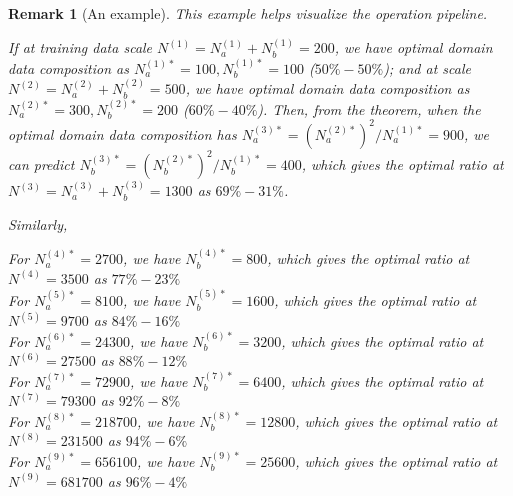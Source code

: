 \documentclass{article} %
\newtheorem{remark}{Remark}
\begin{document}
\begin{appendices}{}
\begin{remark} [An example]
    This example helps visualize the operation pipeline. 
    
    If at training data scale $N^{(1)}=N_a^{(1)}+N_b^{(1)}=200$, we have optimal domain data composition as $N_a^{(1)*}=100, N_b^{(1)*}=100$ ($50\%-50\%$); and at scale $N^{(2)}=N_a^{(2)}+N_b^{(2)}=500$, we have optimal domain data composition as $N_a^{(2)*}=300, N_b^{(2)*}=200$ ($60\%-40\%$). Then, from the theorem, when the optimal domain data composition has $N_a^{(3)*}=(N_a^{(2)*})^2/N_a^{(1)*}=900$, we can predict $N_b^{(3)*}=(N_b^{(2)*})^2/N_b^{(1)*}=400$, which gives the optimal ratio at $N^{(3)}=N_a^{(3)}+N_b^{(3)}=1300$ as $69\%-31\%$. 
    
    Similarly, 
    
\small 
For $N_a^{(4)*}=2700$, we have $N_b^{(4)*}=800$, which gives the optimal ratio at $N^{(4)}=3500$ as $77\%-23\%$\\
For $N_a^{(5)*}=8100$, we have $N_b^{(5)*}=1600$, which gives the optimal ratio at $N^{(5)}=9700$ as $84\%-16\%$\\
For $N_a^{(6)*}=24300$, we have $N_b^{(6)*}=3200$, which gives the optimal ratio at $N^{(6)}=27500$ as $88\%-12\%$\\
For $N_a^{(7)*}=72900$, we have $N_b^{(7)*}=6400$, which gives the optimal ratio at $N^{(7)}=79300$ as $92\%-8\%$\\
For $N_a^{(8)*}=218700$, we have $N_b^{(8)*}=12800$, which gives the optimal ratio at $N^{(8)}=231500$ as $94\%-6\%$\\
For $N_a^{(9)*}=656100$, we have $N_b^{(9)*}=25600$, which gives the optimal ratio at $N^{(9)}=681700$ as $96\%-4\%$\normalsize


\end{remark}
\end{appendices}
\end{document}
